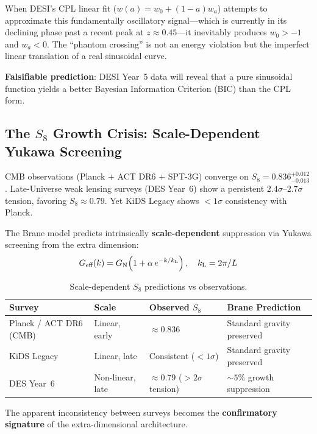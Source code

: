 When DESI's CPL linear fit ($w(a) = w_0 + (1-a)w_a$) attempts to approximate this fundamentally oscillatory signal---which is currently in its declining phase past a recent peak at $z \approx 0.45$---it inevitably produces $w_0 > -1$ and $w_a < 0$. The ``phantom crossing'' is not an energy violation but the imperfect linear translation of a real sinusoidal curve.

\textbf{Falsifiable prediction}: DESI Year~5 data will reveal that a pure sinusoidal function yields a better Bayesian Information Criterion (BIC) than the CPL form.

\subsection{The $S_8$ Growth Crisis: Scale-Dependent Yukawa Screening}
\label{sec:s8_crisis}

CMB observations (Planck + ACT DR6 + SPT-3G) converge on $S_8 = 0.836^{+0.012}_{-0.013}$. Late-Universe weak lensing surveys (DES Year~6) show a persistent $2.4\sigma$--$2.7\sigma$ tension, favoring $S_8 \approx 0.79$. Yet KiDS Legacy shows $< 1\sigma$ consistency with Planck.

The Brane model predicts intrinsically \textbf{scale-dependent} suppression via Yukawa screening from the extra dimension:
\begin{equation}
G_\text{eff}(k) = G_\text{N}\!\left(1 + \alpha\,e^{-k/k_\text{L}}\right), \quad k_\text{L} = 2\pi/L
\end{equation}

\begin{table}[h]
\centering
\caption{Scale-dependent $S_8$ predictions vs observations.}
\begin{tabular}{@{}llll@{}}
\toprule
\textbf{Survey} & \textbf{Scale} & \textbf{Observed $S_8$} & \textbf{Brane Prediction} \\
\midrule
Planck / ACT DR6 (CMB) & Linear, early & $\approx 0.836$ & Standard gravity preserved \\
KiDS Legacy & Linear, late & Consistent ($< 1\sigma$) & Standard gravity preserved \\
DES Year~6 & Non-linear, late & $\approx 0.79$ ($> 2\sigma$ tension) & $\sim 5\%$ growth suppression \\
\bottomrule
\end{tabular}
\end{table}

The apparent inconsistency between surveys becomes the \textbf{confirmatory signature} of the extra-dimensional architecture.

